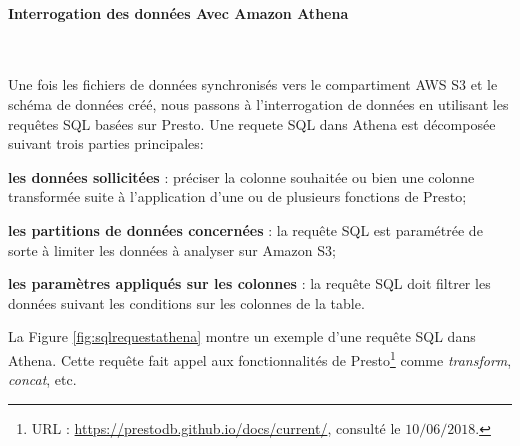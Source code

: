 \begin{table}[H]
	\caption{Exemple d'utilisation des partitions dans une requête SQL dans Amazon Athena}
	\label{partitions-sql}
\end{table}

\paragraph{Interrogation des données Avec Amazon Athena}~  \label{sql-athena-request}

Une fois les fichiers de données  synchronisés vers le compartiment AWS S3 et le schéma  de données  créé, nous  passons à l'interrogation de données en utilisant les requêtes SQL basées sur Presto.  Une requete SQL dans Athena est décomposée suivant trois parties principales:

	\textbf{les données sollicitées} : préciser  la  colonne souhaitée ou  bien une colonne transformée suite à l'application d'une ou de plusieurs fonctions de Presto;
	
    \textbf{les partitions de données concernées} : la requête SQL est paramétrée de sorte à limiter les données à analyser sur Amazon S3;
	
	\textbf{les paramètres appliqués sur les colonnes} : la requête SQL doit filtrer les données suivant les conditions sur les colonnes de la table.


La Figure \ref{fig:sqlrequestathena} montre  un exemple d'une  requête SQL dans Athena.  Cette requête fait appel aux fonctionnalités  de Presto\footnote{URL : \url{https://prestodb.github.io/docs/current/}, consulté le $10/06/2018$.} comme  \textit{transform}, \textit{concat}, etc. 

